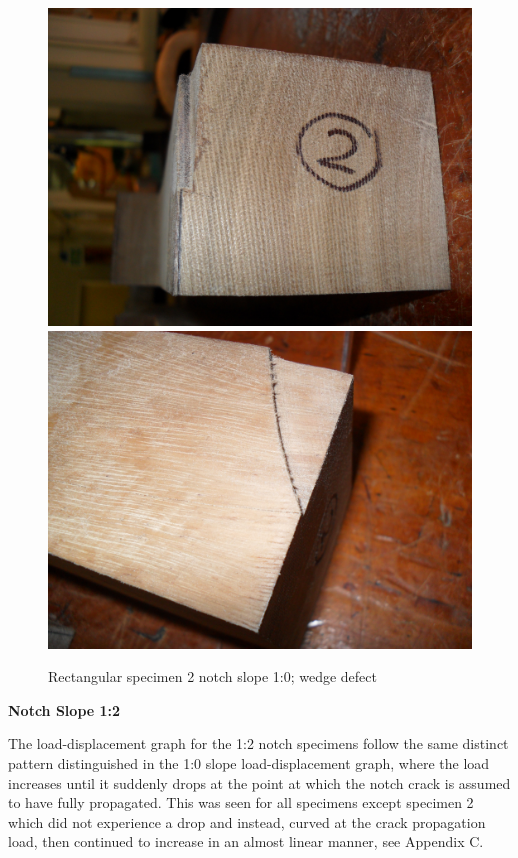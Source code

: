 \documentclass[11pt,a4paper]{article}
\numberwithin{equation}{subsection}
\begin{document}
\begin{figure}[h]
	\begin{center}
		\includegraphics[scale=0.065]{End_wedge}
		\includegraphics[scale=0.065]{Top_wedge}
	\end{center}
	\caption{Rectangular specimen 2 notch slope 1:0; wedge defect}
	\label{fig:Rect_2_wedge}
\end{figure}

\pagebreak

\noindent
\textbf{Notch Slope 1:2}\par
\noindent
The load-displacement graph for the 1:2 notch specimens follow the same distinct pattern distinguished in the 1:0 slope load-displacement graph, where the load increases until it suddenly drops at the point at which the notch crack is assumed to have fully propagated. This was seen for all specimens except specimen 2 which did not experience a drop and instead, curved at the crack propagation load, then continued to increase in an almost linear manner, see Appendix C. 
\end{document}
